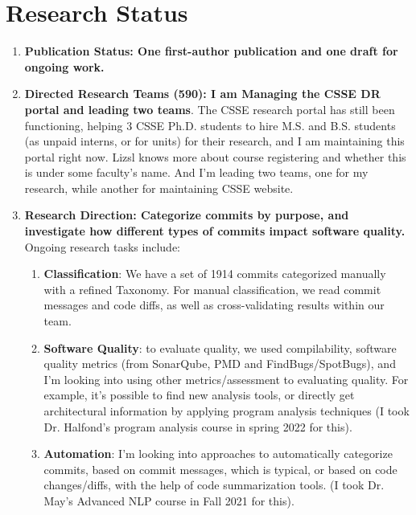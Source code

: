 \documentclass{article}
\begin{document}
\section*{Research Status}
\begin{enumerate}
\item \textbf{Publication Status: One first-author publication and one draft for ongoing work.}
\item \textbf{Directed Research Teams (590): I am Managing the CSSE DR portal and leading two teams}. The CSSE research portal has still been functioning, helping 3 CSSE Ph.D. students to hire M.S. and B.S. students (as unpaid interns, or for units) for their research, and I am maintaining this portal right now. Lizsl knows more about course registering and whether this is under some faculty’s name. And I’m leading two teams, one for my research, while another for maintaining CSSE website.


\item \textbf{Research Direction: Categorize commits by purpose, and investigate how different types of commits impact software quality.} Ongoing research tasks include: 

\begin{enumerate}
\item \textbf{Classification}: We have a set of 1914 commits categorized manually with a refined Taxonomy. For manual classification, we read commit messages and code diffs, as well as cross-validating results within our team.
\item \textbf{Software Quality}: to evaluate quality, we used compilability, software quality metrics (from SonarQube, PMD and FindBugs/SpotBugs), and I’m looking into using other metrics/assessment to evaluating quality. For example, it’s possible to find new analysis tools, or directly get architectural information by applying program analysis techniques (I took Dr. Halfond’s program analysis course in spring 2022 for this).
\item \textbf{Automation}: I’m looking into approaches to automatically categorize commits, based on commit messages, which is typical, or based on code changes/diffs, with the help of code summarization tools. (I took Dr. May’s Advanced NLP course in Fall 2021 for this).
\end{enumerate}

\end{enumerate}
\end{document}
